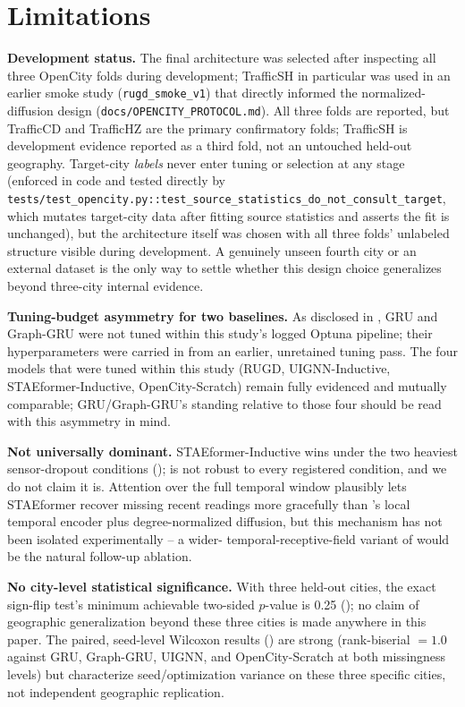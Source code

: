 \section{Limitations}
\label{sec:limitations}

\textbf{Development status.} The final architecture was selected after inspecting all three
OpenCity folds during development; TrafficSH in particular was used in an earlier smoke study
(\texttt{rugd\_smoke\_v1}) that directly informed the normalized-diffusion design
(\texttt{docs/OPENCITY\_PROTOCOL.md}). All three folds are reported, but TrafficCD and TrafficHZ
are the primary confirmatory folds; TrafficSH is development evidence reported as a third fold,
not an untouched held-out geography. Target-city \emph{labels} never enter tuning or selection at
any stage (enforced in code and tested directly by
\texttt{tests/test\_opencity.py::test\_source\_statistics\_do\_not\_consult\_target}, which mutates
target-city data after fitting source statistics and asserts the fit is unchanged), but the
architecture itself was chosen with all three folds' unlabeled structure visible during
development. A genuinely unseen fourth city or an external dataset is the only way to settle
whether this design choice generalizes beyond three-city internal evidence.

\textbf{Tuning-budget asymmetry for two baselines.} As disclosed in , GRU and
Graph-GRU were not tuned within this study's logged Optuna pipeline; their hyperparameters were
carried in from an earlier, unretained tuning pass. The four models that were tuned within this
study (RUGD, UIGNN-Inductive, STAEformer-Inductive, OpenCity-Scratch) remain fully evidenced and
mutually comparable; GRU/Graph-GRU's standing relative to those four should be read with this
asymmetry in mind.

\textbf{Not universally dominant.} STAEformer-Inductive wins under the two heaviest sensor-dropout
conditions (); \methodname{} is not robust to every registered condition, and
we do not claim it is. Attention over the full temporal window plausibly lets STAEformer recover
missing recent readings more gracefully than \methodname{}'s local temporal encoder plus
degree-normalized diffusion, but this mechanism has not been isolated experimentally -- a wider-
temporal-receptive-field variant of \methodname{} would be the natural follow-up ablation.

\textbf{No city-level statistical significance.} With three held-out cities, the exact sign-flip
test's minimum achievable two-sided $p$-value is 0.25 (); no claim of geographic
generalization beyond these three cities is made anywhere in this paper. The paired, seed-level
Wilcoxon results () are strong (rank-biserial $=1.0$ against GRU,
Graph-GRU, UIGNN, and OpenCity-Scratch at both missingness levels) but characterize
seed/optimization variance on these three specific cities, not independent geographic replication.

